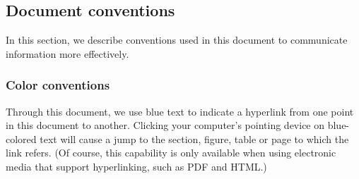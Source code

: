 



\subsection{Document conventions}
\label{sec:notation}

In this section, we describe conventions used in this document to
communicate information more effectively.


\subsubsection{Color conventions}
\label{sec:notation-color}

Through this document, we use blue text to indicate a hyperlink
from one point in this document to another.  Clicking your
computer's pointing device on blue-colored text will cause a jump
to the section, figure, table or page to which the link refers.
(Of course, this capability is only available when using
electronic media that support hyperlinking, such as PDF and HTML.)






